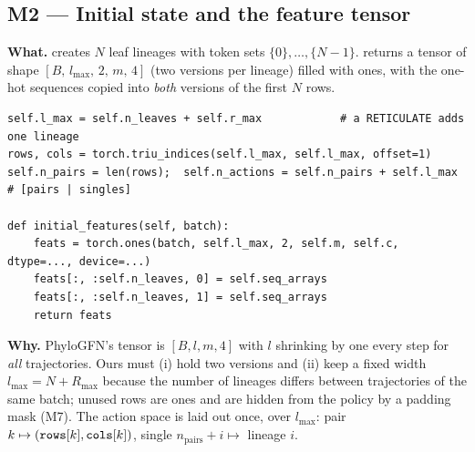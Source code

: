 \subsection{M2 --- Initial state and the feature tensor}
\textbf{What.}  creates $N$ leaf lineages with token sets $\{0\},\dots,\{N-1\}$.  returns a tensor of shape $[B,\,l_{\max},\,2,\,m,\,4]$ (two versions per lineage) filled with ones, with the one-hot sequences copied into \emph{both} versions of the first $N$ rows.
\begin{lstlisting}
self.l_max = self.n_leaves + self.r_max            # a RETICULATE adds one lineage
rows, cols = torch.triu_indices(self.l_max, self.l_max, offset=1)
self.n_pairs = len(rows);  self.n_actions = self.n_pairs + self.l_max   # [pairs | singles]

def initial_features(self, batch):
    feats = torch.ones(batch, self.l_max, 2, self.m, self.c, dtype=..., device=...)
    feats[:, :self.n_leaves, 0] = self.seq_arrays
    feats[:, :self.n_leaves, 1] = self.seq_arrays
    return feats
\end{lstlisting}
\textbf{Why.} PhyloGFN's tensor is $[B,l,m,4]$ with $l$ shrinking by one every step for \emph{all} trajectories. Ours must (i) hold two versions and (ii) keep a fixed width $l_{\max}=N+R_{\max}$ because the number of lineages differs between trajectories of the same batch; unused rows are ones and are hidden from the policy by a padding mask (M7). The action space is laid out once, over $l_{\max}$: pair $k\mapsto(\texttt{rows}[k],\texttt{cols}[k])$, single $n_{\text{pairs}}+i\mapsto$ lineage $i$.


